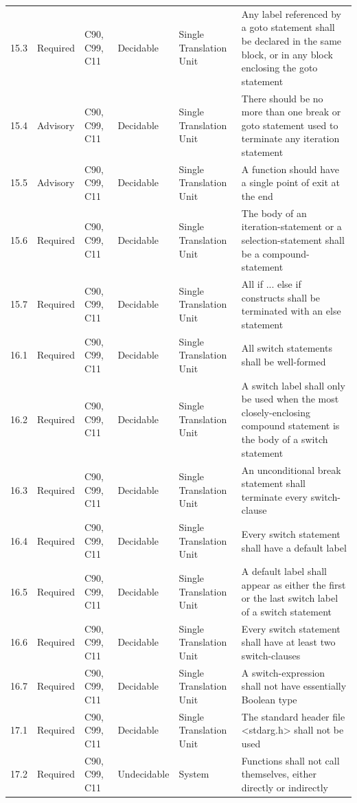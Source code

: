 \documentclass[11pt]{article}
\begin{document}
{\begin{longtable}{@{}p{1.0cm}p{1.6cm}p{1.8cm}p{2.0cm}p{1.6cm}p{7.4cm}@{}}
15.3 & Required & C90, C99, C11 & Decidable & Single Translation Unit & Any label referenced by a goto statement shall be declared in the same block, or in any block enclosing the goto statement \\
15.4 & Advisory & C90, C99, C11 & Decidable & Single Translation Unit & There should be no more than one break or goto statement used to terminate any iteration statement \\
15.5 & Advisory & C90, C99, C11 & Decidable & Single Translation Unit & A function should have a single point of exit at the end \\
15.6 & Required & C90, C99, C11 & Decidable & Single Translation Unit & The body of an iteration-statement or a selection-statement shall be a compound-statement \\
15.7 & Required & C90, C99, C11 & Decidable & Single Translation Unit & All if ... else if constructs shall be terminated with an else statement \\
16.1 & Required & C90, C99, C11 & Decidable & Single Translation Unit & All switch statements shall be well-formed \\
16.2 & Required & C90, C99, C11 & Decidable & Single Translation Unit & A switch label shall only be used when the most closely-enclosing compound statement is the body of a switch statement \\
16.3 & Required & C90, C99, C11 & Decidable & Single Translation Unit & An unconditional break statement shall terminate every switch-clause \\
16.4 & Required & C90, C99, C11 & Decidable & Single Translation Unit & Every switch statement shall have a default label \\
16.5 & Required & C90, C99, C11 & Decidable & Single Translation Unit & A default label shall appear as either the first or the last switch label of a switch statement \\
16.6 & Required & C90, C99, C11 & Decidable & Single Translation Unit & Every switch statement shall have at least two switch-clauses \\
16.7 & Required & C90, C99, C11 & Decidable & Single Translation Unit & A switch-expression shall not have essentially Boolean type \\
17.1 & Required & C90, C99, C11 & Decidable & Single Translation Unit & The standard header file <stdarg.h> shall not be used \\
17.2 & Required & C90, C99, C11 & Undecidable & System & Functions shall not call themselves, either directly or indirectly \\

\end{longtable}}
\end{document}
